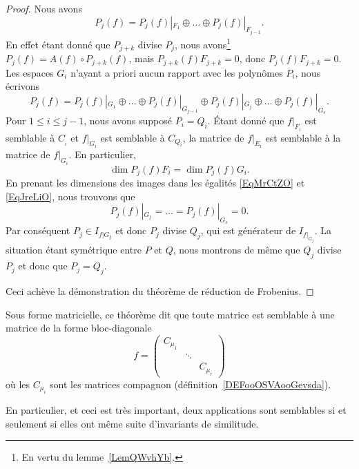 \begin{proof}
    Nous avons
    \begin{equation}    \label{EqMrCtZO}
        P_j(f)=P_j(f)|_{F_1}\oplus\ldots\oplus P_j(f)|_{F_{j-1}}.
    \end{equation}
    En effet étant donné que \( P_{j+k}\) divise \( P_j\), nous avons\footnote{En vertu du lemme~\ref{LemQWvhYb}.} \( P_{j}(f)=A(f)\circ P_{j+k}(f)\), mais \( P_{j+k}(f)F_{j+k}=0\), donc \( P_j(f)F_{j+k}=0\). Les espaces \( G_i\) n'ayant a priori aucun rapport avec les polynômes \( P_i\), nous écrivons
    \begin{equation}    \label{EqJreLiO}
        P_j(f)=P_j(f)|_{G_1}\oplus\ldots\oplus P_j(f)|_{G_{j-1}}\oplus P_j(f)|_{G_j}\oplus\ldots\oplus P_j(f)|_{G_s}.
    \end{equation}
    Pour \( 1\leq i\leq j-1\), nous avons supposé \( P_i=Q_i\). Étant donné que \( f|_{F_i}\) est semblable à \( C_{_i}\) et \( f|_{G_i}\) est semblable à \( C_{Q_i}\), la matrice de \( f|_{E_i}\) est semblable à la matrice de \( f|_{G_i}\). En particulier,
    \begin{equation}
        \dim P_j(f)F_i=\dim P_j(f)G_i.
    \end{equation}
    En prenant les dimensions des images dans les égalités \eqref{EqMrCtZO} et \eqref{EqJreLiO}, nous trouvons que
    \begin{equation}
        P_j(f)|_{G_j}=\ldots=P_j(f)|_{G_s}=0.
    \end{equation}
    Par conséquent \( P_j\in I_{f|G_j}\) et donc \( P_j\) divise \( Q_j\), qui est générateur de \( I_{f|_{G_j}}\). La situation étant symétrique entre \( P\) et \( Q\), nous montrons de même que \( Q_j\) divise \( P_j\) et donc que \( P_j=Q_j\).

    Ceci achève la démonstration du théorème de réduction de Frobenius.

\end{proof}

\begin{remark}      \label{REMooPVLEooYDRXQI}
    Sous forme matricielle, ce théorème dit que toute matrice est semblable à une matrice de la forme bloc-diagonale
    \begin{equation}
        f=\begin{pmatrix}
            C_{\mu_1}    &       &       \\
                &   \ddots    &       \\
                &       &   C_{\mu_r}
        \end{pmatrix}
    \end{equation}
    où les \( C_{\mu_i}\) sont les matrices compagnon (définition~\ref{DEFooOSVAooGevsda}).

    En particulier, et ceci est très important, deux applications sont semblables si et seulement si elles ont même suite d'invariants de similitude.
\end{remark}


